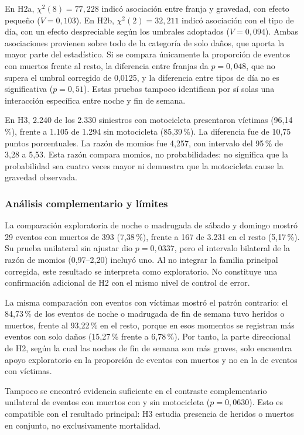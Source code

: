 \documentclass[12pt,letterpaper]{article}
\begin{document}
En H2a, $\chi^2(8)=77{,}228$ indicó asociación entre franja y gravedad,
con efecto pequeño ($V=0{,}103$). En H2b,
$\chi^2(2)=32{,}211$ indicó asociación con el tipo de día, con un
efecto despreciable según los umbrales adoptados ($V=0{,}094$). Ambas
asociaciones provienen sobre todo de la categoría de solo daños, que
aporta la mayor parte del estadístico. Si se compara únicamente la
proporción de eventos con muertos frente al resto, la diferencia entre
franjas da $p=0{,}048$, que no supera el umbral corregido de 0,0125, y
la diferencia entre tipos de día no es significativa ($p=0{,}51$).
Estas pruebas tampoco identifican por sí solas una interacción
específica entre noche y fin de semana.

En H3, 2.240 de los 2.330 siniestros con motocicleta presentaron víctimas
(96,14\,\%), frente a 1.105 de 1.294 sin motocicleta (85,39\,\%).
La diferencia fue de 10,75 puntos porcentuales. La razón de momios fue
4,257, con intervalo del 95\,\% de 3,28 a 5,53. Esta razón compara
momios, no probabilidades: no significa que la probabilidad sea cuatro
veces mayor ni demuestra que la motocicleta cause la gravedad observada.

\subsubsection{Análisis complementario y límites}

La comparación exploratoria de noche o madrugada de sábado y domingo
mostró 29 eventos con muertos de 393 (7,38\,\%), frente a 167 de
3.231 en el resto (5,17\,\%). Su prueba unilateral sin ajustar dio
$p=0{,}0337$, pero el intervalo bilateral de la razón de momios
(0,97--2,20) incluyó uno. Al no integrar la familia principal corregida,
este resultado se interpreta como exploratorio. No constituye una
confirmación adicional de H2 con el mismo nivel de control de error.

La misma comparación con eventos con víctimas mostró el patrón
contrario: el 84,73\,\% de los eventos de noche o madrugada de fin de
semana tuvo heridos o muertos, frente al 93,22\,\% en el resto, porque
en esos momentos se registran más eventos con solo daños (15,27\,\%
frente a 6,78\,\%). Por tanto, la parte direccional de H2, según la
cual las noches de fin de semana son más graves, solo encuentra apoyo
exploratorio en la proporción de eventos con muertos y no en la de
eventos con víctimas.

Tampoco se encontró evidencia suficiente en el contraste complementario
unilateral de eventos con muertos con y sin motocicleta ($p=0{,}0630$).
Esto es compatible con el resultado principal: H3 estudia presencia de
heridos o muertos en conjunto, no exclusivamente mortalidad.
\end{document}
